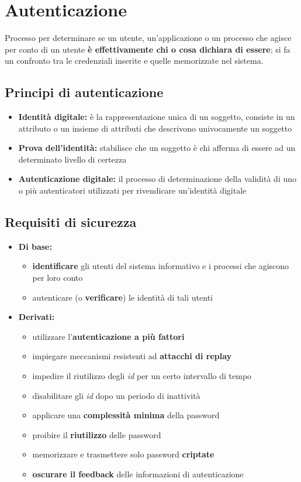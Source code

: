 \chapter{Autenticazione}
Processo per determinare se un utente, un'applicazione o un processo che agisce per conto di un utente 
\textbf{è effettivamente chi o cosa dichiara di essere}; si fa un confronto tra le credenziali 
inserite e quelle memorizzate nel sistema.

\section{Principi di autenticazione}
\begin{itemize}
    \item \textbf{Identità digitale:} è la rappresentazione unica di un soggetto, consiste in 
    un attributo o un insieme di attributi che descrivono univocamente un soggetto 
    \item \textbf{Prova dell'identità:} stabilisce che un soggetto è chi afferma di essere ad un determinato 
    livello di certezza
    \item \textbf{Autenticazione digitale:} il processo di determinazione della validità di uno o più 
    autenticatori utilizzati per rivendicare un'identità digitale 
\end{itemize}

\section{Requisiti di sicurezza}
\begin{itemize}
    \item \textbf{Di base:} 
    \begin{itemize}
        \item \textbf{identificare} gli utenti del sistema informativo e i processi che agiscono per loro conto 
        \item autenticare (o \textbf{verificare}) le identità di tali utenti 
    \end{itemize} 
    \item \textbf{Derivati:}
    \begin{itemize}
        \item utilizzare l'\textbf{autenticazione a più fattori}
        \item impiegare meccanismi resistenti ad \textbf{attacchi di replay}
        \item impedire il riutilizzo degli \textit{id} per un certo intervallo di tempo 
        \item disabilitare gli \textit{id} dopo un periodo di inattività
        \item applicare una \textbf{complessità minima} della password
        \item proibire il \textbf{riutilizzo} delle password 
        \item memorizzare e trasmettere solo password \textbf{criptate}
        \item \textbf{oscurare il feedback} delle informazioni di autenticazione
    \end{itemize}
\end{itemize}

